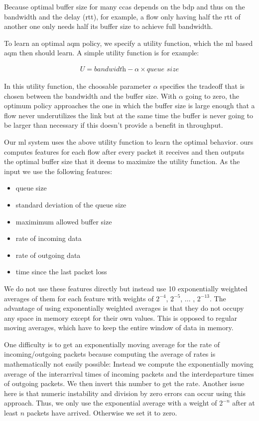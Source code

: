 \documentclass[10pt,sigconf,letterpaper,anonymous]{acmart}
\begin{document}
Because optimal buffer size for many \glspl{cca} depends on the \gls{bdp} and thus on the bandwidth and the delay (\gls{rtt}), for example, a flow only having half the \gls{rtt} of another one only needs half its buffer size to achieve full bandwidth. 

To learn an optimal \gls{aqm} policy, we specify a utility function, which the \gls{ml} based \gls{aqm} then should learn. A simple utility function is for example:

\begin{align}
U = \textit{bandwidth}-\alpha\times\textit{queue size}
\end{align}

In this utility function, the choosable parameter $\alpha$ specifies the tradeoff that is chosen between the bandwidth and the buffer size. With $\alpha$ going to zero, the optimum policy approaches the one in which the buffer size is large enough that a flow never underutilizes the link but at the same time the buffer is never going to be larger than necessary if this doesn't provide a benefit in throughput. 

Our \gls{ml} system uses the above utility function to learn the optimal behavior. \gls{ours} computes features for each flow after every packet it receives and then outputs the optimal buffer size that it deems to maximize the utility function. As the input we use the following features: 
\begin{itemize}
\item queue size
\item standard deviation of the queue size 
\item maximimum allowed buffer size
\item rate of incoming data
\item rate of outgoing data
\item time since the last packet loss
\end{itemize}
We do not use these features directly but instead use 10 exponentially weighted averages of them for each feature with weights of $2^{-4}$, $2^{-5}$, ... , $2^{-13}$. The advantage of using exponentially weighted averages is that they do not occupy any space in memory except for their own values. This is opposed to regular moving averages, which have to keep the entire window of data in memory. 

One difficulty is to get an exponentially moving average for the rate of incoming/outgoing packets because computing the average of rates is mathematically not easily possible: Instead we compute the exponentially moving average of the interarrival times of incoming packets and the interdeparture times of outgoing packets. We then invert this number to get the rate. Another issue here is that numeric instability and division by zero errors can occur using this approach. Thus, we only use the exponential average with a weight of $2^{-n}$ after at least $n$ packets have arrived. Otherwise we set it to zero. 
\end{document}
